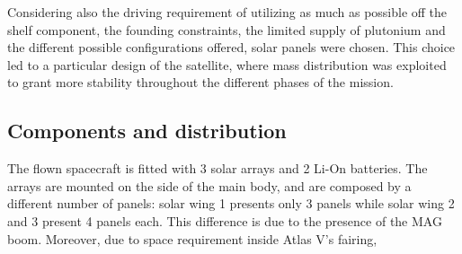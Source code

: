 Considering also the driving requirement of utilizing as much as possible off the shelf component, the founding constraints, the limited supply of plutonium and the different possible configurations offered, solar panels were chosen. This choice led to a particular design of the satellite, where mass distribution was exploited to grant more stability throughout the different phases of the mission.  

\subsection{Components and distribution}
\label{subsec:components_and_distribution}

The flown spacecraft is fitted with 3 solar arrays and 2 Li-On batteries. The arrays are mounted on the side of the main body, and are composed by a different number of panels: solar wing 1 presents only 3 panels while solar wing 2 and 3 present 4 panels each. This difference is due to the presence of the MAG boom. Moreover, due to space requirement inside Atlas V's fairing, 


